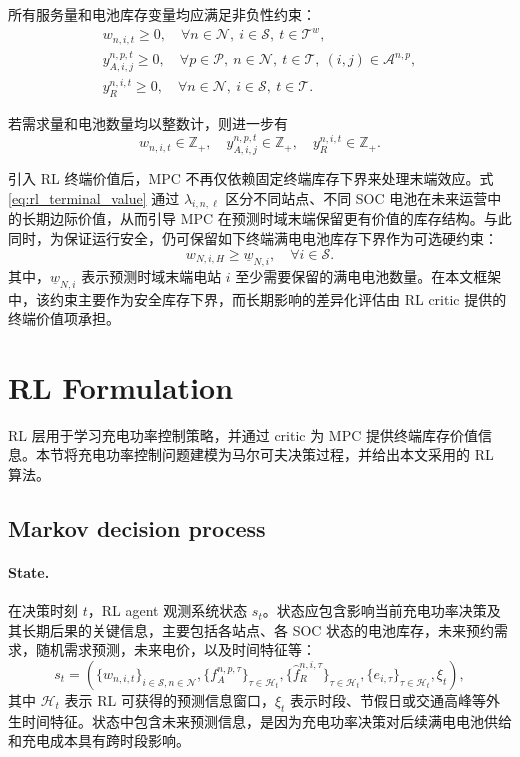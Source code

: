 \documentclass[12pt,hyperref,a4paper,UTF8]{ctexart}
\begin{document}
所有服务量和电池库存变量均应满足非负性约束：
\begin{gather}
w_{n,i,t}\ge 0,
\quad \forall n\in \mathcal{N},\ i\in \mathcal{S},\ t\in \mathcal{T}^{w},
\label{eq:nonnegative_w}\\
y_{A,i,j}^{n,p,t}\ge 0,
\quad \forall p\in \mathcal{P},\ n\in \mathcal{N},\ t\in \mathcal{T},\ (i,j)\in \mathcal{A}^{n,p},
\label{eq:nonnegative_a}\\
y_R^{n,i,t}\ge 0,
\quad \forall n\in \mathcal{N},\ i\in \mathcal{S},\ t\in \mathcal{T}.
\label{eq:nonnegative_r}
\end{gather}

若需求量和电池数量均以整数计，则进一步有
\begin{equation}
w_{n,i,t}\in \mathbb{Z}_{+},\quad
 y_{A,i,j}^{n,p,t}\in \mathbb{Z}_{+},\quad
 y_R^{n,i,t}\in \mathbb{Z}_{+}.
\label{eq:integer}
\end{equation}

引入 RL 终端价值后，MPC 不再仅依赖固定终端库存下界来处理末端效应。式\eqref{eq:rl_terminal_value} 通过 $\lambda_{i,n,\ell}$ 区分不同站点、不同 SOC 电池在未来运营中的长期边际价值，从而引导 MPC 在预测时域末端保留更有价值的库存结构。与此同时，为保证运行安全，仍可保留如下终端满电电池库存下界作为可选硬约束：
\begin{equation}
w_{N,i,H}\ge \underline{w}_{N,i},
\quad \forall i\in \mathcal{S}.
\label{eq:terminal_inventory}
\end{equation}
其中，$\underline{w}_{N,i}$ 表示预测时域末端电站 $i$ 至少需要保留的满电电池数量。在本文框架中，该约束主要作为安全库存下界，而长期影响的差异化评估由 RL critic 提供的终端价值项承担。

\section{RL Formulation}

RL 层用于学习充电功率控制策略，并通过 critic 为 MPC 提供终端库存价值信息。本节将充电功率控制问题建模为马尔可夫决策过程，并给出本文采用的 RL 算法。

\subsection{Markov decision process}

\paragraph{State.}
在决策时刻 $t$，RL agent 观测系统状态 $s_t$。状态应包含影响当前充电功率决策及其长期后果的关键信息，主要包括各站点、各 SOC 状态的电池库存，未来预约需求，随机需求预测，未来电价，以及时间特征等：
\begin{equation}
s_t=
\left(
\{w_{n,i,t}\}_{i\in\mathcal{S},n\in\mathcal{N}},
\{f_A^{n,p,\tau}\}_{\tau\in\mathcal{H}_t},
\{\hat f_R^{n,i,\tau}\}_{\tau\in\mathcal{H}_t},
\{e_{i,\tau}\}_{\tau\in\mathcal{H}_t},
\xi_t
\right),
\label{eq:rl_state}
\end{equation}
其中 $\mathcal{H}_t$ 表示 RL 可获得的预测信息窗口，$\xi_t$ 表示时段、节假日或交通高峰等外生时间特征。状态中包含未来预测信息，是因为充电功率决策对后续满电电池供给和充电成本具有跨时段影响。
\end{document}
